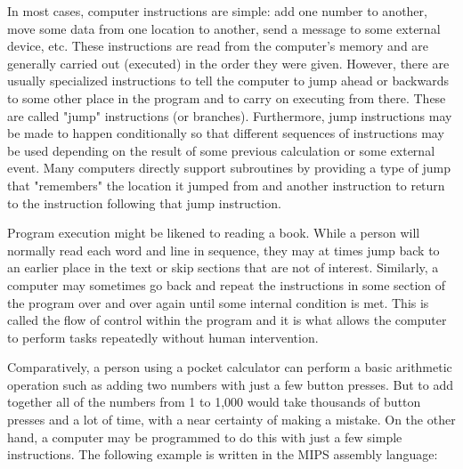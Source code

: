\documentclass[a4paper,11pt]{IEEEtran}
\begin{document}
In most cases, computer instructions are simple: add one number to another, move some data from one location to another, send a message to some external device, etc. These instructions are read from the computer's memory and are generally carried out (executed) in the order they were given. However, there are usually specialized instructions to tell the computer to jump ahead or backwards to some other place in the program and to carry on executing from there. These are called "jump" instructions (or branches). Furthermore, jump instructions may be made to happen conditionally so that different sequences of instructions may be used depending on the result of some previous calculation or some external event. Many computers directly support subroutines by providing a type of jump that "remembers" the location it jumped from and another instruction to return to the instruction following that jump instruction.

Program execution might be likened to reading a book. While a person will normally read each word and line in sequence, they may at times jump back to an earlier place in the text or skip sections that are not of interest. Similarly, a computer may sometimes go back and repeat the instructions in some section of the program over and over again until some internal condition is met. This is called the flow of control within the program and it is what allows the computer to perform tasks repeatedly without human intervention.

Comparatively, a person using a pocket calculator can perform a basic arithmetic operation such as adding two numbers with just a few button presses. But to add together all of the numbers from 1 to 1,000 would take thousands of button presses and a lot of time, with a near certainty of making a mistake. On the other hand, a computer may be programmed to do this with just a few simple instructions. The following example is written in the MIPS assembly language:
\end{document}
